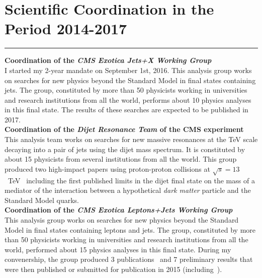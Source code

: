 \documentclass[10pt, a4paper]{article}
\newcommand{\years}[1]{\marginnote{\hskip-0.2in{\small #1}}}
\begin{document}
\section*{Scientific Coordination in the Period 2014-2017}
\vspace{-5pt}
\hrule
\vspace{10pt}
\years{09/2016 - today}\textbf{Coordination of the \emph{CMS Exotica
    Jets+X Working Group}} \\
I started my 2-year mandate on September 1st, 2016.
This analysis group works on searches for new physics beyond the
Standard Model in final states containing jets. The group, 
constituted by more than 50 physicists working in universities and
research institutions from all the world, performs
about 10 physics analyses in this final state. The results of these
searches are expected to be published in 2017. \\ [1em]
\years{09/2014 - 09/2016}\textbf{Coordination of the \emph{Dijet Resonance
  Team} of the CMS experiment}\\
This analysis team works on searches for new massive resonances at the TeV
scale decaying into a pair of jets using the dijet mass spectrum. It is
constituted by about 15 physicists from several institutions from
all the world. This group produced two high-impact papers using proton-proton
collisions at $\sqrt{s}=13$~TeV~\cite{Sirunyan:2016iap,Khachatryan:2015dcf} 
including the first published limits in the dijet final state on the
mass of a mediator of the interaction between a hypothetical {\it dark
  matter} particle and the Standard Model quarks.\\[1em]
\years{01/2013 - 01/2015}\textbf{Coordination of the \emph{CMS Exotica
    Leptons+Jets Working Group}}\\
This analysis group works on searches for new physics beyond the
Standard Model in final states containing leptons and jets. The group, 
constituted by more than 50 physicists working in universities and
research institutions from all the world, performed about 15 physics
analyses in this final state. During my convenership, the group
produced 3 publications~\cite{Khachatryan:2014ura,Khachatryan:2014dka,Khachatryan:2014gha}
and 7 preliminary results that were then published or submitted for
publication in 2015 (including~\cite{Khachatryan:2016yji,Khachatryan:2015ywa,Khachatryan:2015vaa}).
\end{document}
